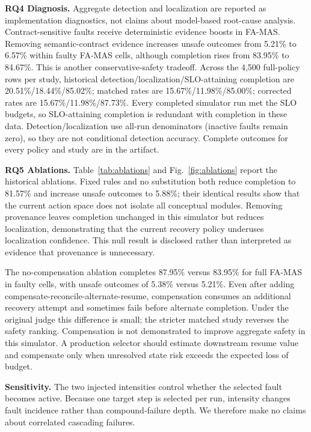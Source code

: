 \documentclass[10pt,journal,compsoc]{IEEEtran}
\newcommand{\famas}{FA-MAS}
\begin{document}
\textbf{RQ4 Diagnosis.} Aggregate detection and localization are reported as implementation diagnostics, not claims about model-based root-cause analysis. Contract-sensitive faults receive deterministic evidence boosts in \famas{}. Removing semantic-contract evidence increases unsafe outcomes from 5.21\% to 6.57\% within faulty \famas{} cells, although completion rises from 83.95\% to 84.67\%. This is another conservative-safety tradeoff. Across the 4,500 full-policy rows per study, historical detection/localization/SLO-attaining completion are 20.51\%/18.44\%/85.02\%; matched rates are 15.67\%/11.98\%/85.00\%; corrected rates are 15.67\%/11.98\%/87.73\%. Every completed simulator run met the SLO budgets, so SLO-attaining completion is redundant with completion in these data. Detection/localization use all-run denominators (inactive faults remain zero), so they are not conditional detection accuracy. Complete outcomes for every policy and study are in the artifact.

\textbf{RQ5 Ablations.} Table~\ref{tab:ablations} and Fig.~\ref{fig:ablations} report the historical ablations. Fixed rules and no substitution both reduce completion to 81.57\% and increase unsafe outcomes to 5.88\%; their identical results show that the current action space does not isolate all conceptual modules. Removing provenance leaves completion unchanged in this simulator but reduces localization, demonstrating that the current recovery policy underuses localization confidence. This null result is disclosed rather than interpreted as evidence that provenance is unnecessary.

The no-compensation ablation completes 87.95\% versus 83.95\% for full \famas{} in faulty cells, with unsafe outcomes of 5.38\% versus 5.21\%. Even after adding compensate-reconcile-alternate-resume, compensation consumes an additional recovery attempt and sometimes fails before alternate completion. Under the original judge this difference is small; the stricter matched study reverses the safety ranking. Compensation is not demonstrated to improve aggregate safety in this simulator. A production selector should estimate downstream resume value and compensate only when unresolved state risk exceeds the expected loss of budget.

\textbf{Sensitivity.} The two injected intensities control whether the selected fault becomes active. Because one target step is selected per run, intensity changes fault incidence rather than compound-failure depth. We therefore make no claims about correlated cascading failures.
\end{document}
